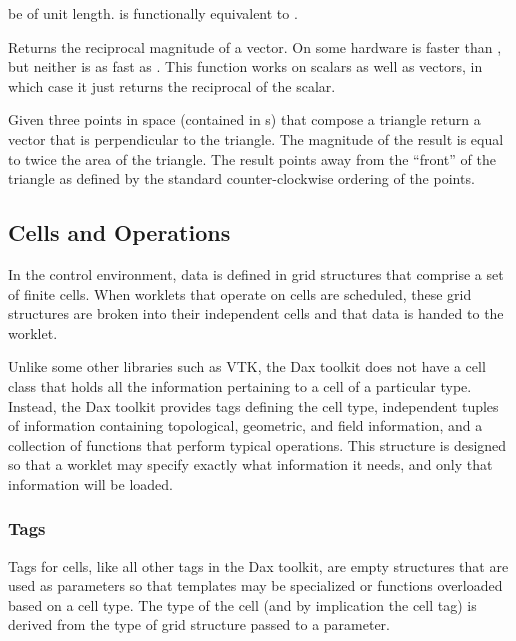 \begin{description}
  be of unit length.  is
  functionally equivalent to
  .
\item[\daxmath{RMagnitude}] Returns the reciprocal magnitude of a
  vector. On some hardware  is faster than
  , but neither is as fast as
  . This function works on scalars as well
  as vectors, in which case it just returns the reciprocal of the scalar.
\item[\daxmath{TriangleNormal}] Given three points in space (contained in
  s) that compose a triangle return a vector that is
  perpendicular to the triangle. The magnitude of the result is equal to
  twice the area of the triangle. The result points away from the ``front''
  of the triangle as defined by the standard counter-clockwise ordering of
  the points.
\end{description}


\subsection{Cells and Operations}
\label{sec:CellsAndOperations}


In the control environment, data is defined in grid structures that
comprise a set of finite cells. When worklets that operate on cells are
scheduled, these grid structures are broken into their independent cells
and that data is handed to the worklet.

Unlike some other libraries such as VTK, the Dax toolkit does not have a
cell class that holds all the information pertaining to a cell of a
particular type. Instead, the Dax toolkit provides tags defining the cell
type, independent tuples of information containing topological, geometric,
and field information, and a collection of functions that perform typical
operations. This structure is designed so that a worklet may specify
exactly what information it needs, and only that information will be
loaded.

\subsubsection{Tags}
\label{sec:CellTags}

Tags for cells, like all other tags in the Dax toolkit, are empty
structures that are used as parameters so that templates may be specialized
or functions overloaded based on a cell type. The type of the cell (and by
implication the cell tag) is derived from the type of grid structure passed
to a  parameter.

